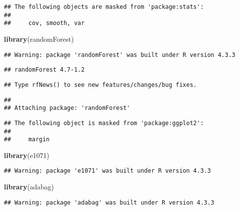 \documentclass[
]{article}
\newenvironment{Shaded}{\begin{snugshade}}{\end{snugshade}}
\newcommand{\FunctionTok}[1]{\textcolor[rgb]{0.13,0.29,0.53}{\textbf{#1}}}
\newcommand{\NormalTok}[1]{#1}
\begin{document}
\begin{verbatim}
## The following objects are masked from 'package:stats':
## 
##     cov, smooth, var
\end{verbatim}

\begin{Shaded}
\begin{Highlighting}[]
\FunctionTok{library}\NormalTok{(randomForest)}
\end{Highlighting}
\end{Shaded}

\begin{verbatim}
## Warning: package 'randomForest' was built under R version 4.3.3
\end{verbatim}

\begin{verbatim}
## randomForest 4.7-1.2
\end{verbatim}

\begin{verbatim}
## Type rfNews() to see new features/changes/bug fixes.
\end{verbatim}

\begin{verbatim}
## 
## Attaching package: 'randomForest'
\end{verbatim}

\begin{verbatim}
## The following object is masked from 'package:ggplot2':
## 
##     margin
\end{verbatim}

\begin{Shaded}
\begin{Highlighting}[]
\FunctionTok{library}\NormalTok{(e1071)}
\end{Highlighting}
\end{Shaded}

\begin{verbatim}
## Warning: package 'e1071' was built under R version 4.3.3
\end{verbatim}

\begin{Shaded}
\begin{Highlighting}[]
\FunctionTok{library}\NormalTok{(adabag)}
\end{Highlighting}
\end{Shaded}

\begin{verbatim}
## Warning: package 'adabag' was built under R version 4.3.3
\end{verbatim}
\end{document}
